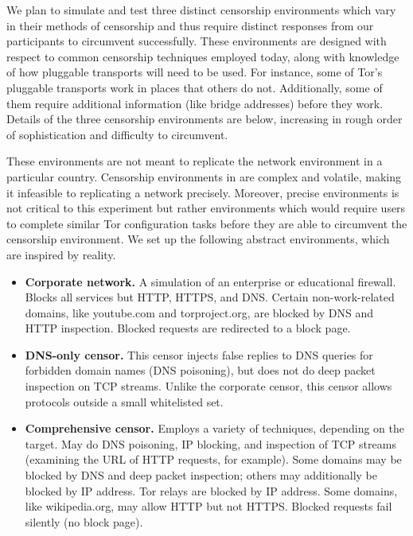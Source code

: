 \documentclass[letterpaper,twocolumn,11pt]{article}
\begin{document}
\indent \indent We plan to simulate and test three distinct censorship environments
which vary in their methods of censorship and thus require distinct responses from our 
participants to circumvent successfully. These environments are designed with respect to 
common censorship techniques employed 
today, along with knowledge of how pluggable transports will need to be used.
For instance, some of Tor's pluggable transports work in places
that others do not. Additionally, some of them require additional information (like bridge 
addresses) before they work.
Details of the three censorship environments are below, increasing in 
rough order of sophistication and difficulty to circumvent. 

These environments are not meant to replicate the network environment
in a particular country.  Censorship environments in are complex and volatile, making
it infeasible to replicating a network precisely. Moreover, precise
environments is not critical to this experiment but rather
environments which would require users to complete similar Tor configuration 
tasks before they are able to circumvent the censorship environment. We set up the following 
abstract environments, which are inspired by reality. 

\begin{itemize} \itemsep1pt \parskip0pt 
\item{\bfseries Corporate network.}
A simulation of an enterprise or educational firewall.
Blocks all services but HTTP, HTTPS, and DNS.
Certain non-work-related domains, like youtube.com and torproject.org,
are blocked by DNS and HTTP inspection.
Blocked requests are redirected to a block page.
\item{\bfseries DNS-only censor.}
This censor injects false replies to DNS queries
for forbidden domain names (DNS poisoning),
but does not do deep packet inspection on TCP streams.
Unlike the corporate censor, this censor allows protocols
outside a small whitelisted set.
\item{\bfseries Comprehensive censor.}
Employs a variety of techniques, depending on the target.
May do DNS poisoning, IP blocking, and inspection of TCP streams
(examining the URL of HTTP requests, for example).
Some domains may be blocked by DNS and deep packet inspection;
others may additionally be blocked by IP address.
Tor relays are blocked by IP address.
Some domains, like wikipedia.org, may allow HTTP but not HTTPS.
Blocked requests fail silently (no block page).
\end{itemize}
\end{document}
